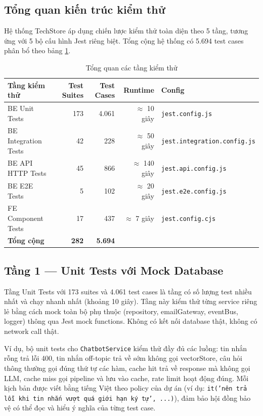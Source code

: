 \subsection{Tổng quan kiến trúc kiểm thử}

Hệ thống TechStore áp dụng chiến lược kiểm thử toàn diện theo 5 tầng, tương ứng với 5 bộ cấu hình Jest riêng biệt. Tổng cộng hệ thống có 5.694 test cases phân bổ theo bảng \ref{tab:test-overview}.

\begin{table}[H]
\centering
\caption{Tổng quan các tầng kiểm thử}
\label{tab:test-overview}
\begin{tabular}{|l|r|r|r|l|}
\hline
\textbf{Tầng kiểm thử} & \textbf{Test Suites} & \textbf{Test Cases} & \textbf{Runtime} & \textbf{Config} \\
\hline
BE Unit Tests & 173 & 4.061 & $\approx$ 10 giây & \texttt{jest.config.js} \\
\hline
BE Integration Tests & 42 & 228 & $\approx$ 50 giây & \texttt{jest.integration.config.js} \\
\hline
BE API HTTP Tests & 45 & 866 & $\approx$ 140 giây & \texttt{jest.api.config.js} \\
\hline
BE E2E Tests & 5 & 102 & $\approx$ 20 giây & \texttt{jest.e2e.config.js} \\
\hline
FE Component Tests & 17 & 437 & $\approx$ 7 giây & \texttt{jest.config.cjs} \\
\hline
\textbf{Tổng cộng} & \textbf{282} & \textbf{5.694} & & \\
\hline
\end{tabular}
\end{table}

\subsection{Tầng 1 — Unit Tests với Mock Database}

Tầng Unit Tests với 173 suites và 4.061 test cases là tầng có số lượng test nhiều nhất và chạy nhanh nhất (khoảng 10 giây). Tầng này kiểm thử từng service riêng lẻ bằng cách mock toàn bộ phụ thuộc (repository, emailGateway, eventBus, logger) thông qua Jest mock functions. Không có kết nối database thật, không có network call thật.

Ví dụ, bộ unit tests cho \texttt{ChatbotService} kiểm thử đầy đủ các luồng: tin nhắn rỗng trả lỗi 400, tin nhắn off-topic trả về sớm không gọi vectorStore, câu hỏi thông thường gọi đúng thứ tự các hàm, cache hit trả về response mà không gọi LLM, cache miss gọi pipeline và lưu vào cache, rate limit hoạt động đúng. Mỗi kịch bản được viết bằng tiếng Việt theo policy của dự án (ví dụ: \texttt{it('nên trả lỗi khi tin nhắn vượt quá giới hạn ký tự', ...)}), đảm bảo hội đồng bảo vệ có thể đọc và hiểu ý nghĩa của từng test case.


